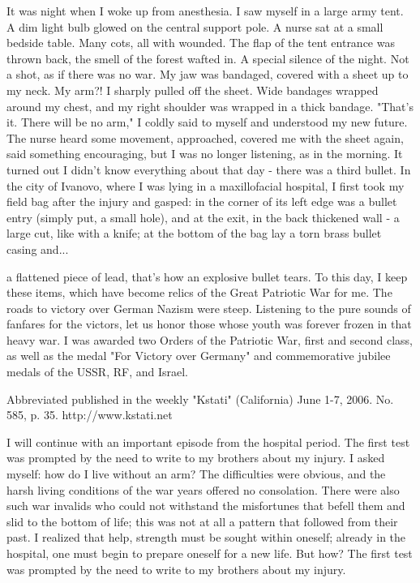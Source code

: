 \label{13-1}
It was night when I woke up from anesthesia. I saw myself in a large army tent. A dim light bulb glowed on the central support pole. A nurse sat at a small bedside table. Many cots, all with wounded. The flap of the tent entrance was thrown back, the smell of the forest wafted in. A special silence of the night. Not a shot, as if there was no war. My jaw was bandaged, covered with a sheet up to my neck. My arm?! I sharply pulled off the sheet. Wide bandages wrapped around my chest, and my right shoulder was wrapped in a thick bandage. "That's it. There will be no arm," I coldly said to myself and understood my new future. The nurse heard some movement, approached, covered me with the sheet again, said something encouraging, but I was no longer listening, as in the morning. It turned out I didn't know everything about that day - there was a third bullet. In the city of Ivanovo, where I was lying in a maxillofacial hospital, I first took my field bag after the injury and gasped: in the corner of its left edge was a bullet entry (simply put, a small hole), and at the exit, in the back thickened wall - a large cut, like with a knife; at the bottom of the bag lay a torn brass bullet casing and...

\label{14-1}
a flattened piece of lead, that's how an explosive bullet tears. To this day, I keep these items, which have become relics of the Great Patriotic War for me. The roads to victory over German Nazism were steep. Listening to the pure sounds of fanfares for the victors, let us honor those whose youth was forever frozen in that heavy war. I was awarded two Orders of the Patriotic War, first and second class, as well as the medal "For Victory over Germany" and commemorative jubilee medals of the USSR, RF, and Israel.

\label{14-2}
Abbreviated published in the weekly "Kstati" (California) June 1-7, 2006. No. 585, p. 35. http://www.kstati.net

\label{14-3}
I will continue with an important episode from the hospital period. The first test was prompted by the need to write to my brothers about my injury. I asked myself: how do I live without an arm? The difficulties were obvious, and the harsh living conditions of the war years offered no consolation. There were also such war invalids who could not withstand the misfortunes that befell them and slid to the bottom of life; this was not at all a pattern that followed from their past. I realized that help, strength must be sought within oneself; already in the hospital, one must begin to prepare oneself for a new life. But how? The first test was prompted by the need to write to my brothers about my injury.


